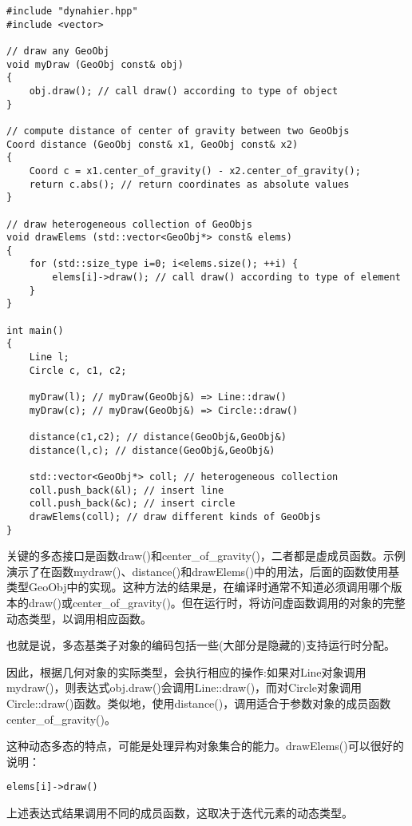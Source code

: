 \begin{lstlisting}[style=styleCXX]
#include "dynahier.hpp"
#include <vector>

// draw any GeoObj
void myDraw (GeoObj const& obj)
{
	obj.draw(); // call draw() according to type of object
}

// compute distance of center of gravity between two GeoObjs
Coord distance (GeoObj const& x1, GeoObj const& x2)
{
	Coord c = x1.center_of_gravity() - x2.center_of_gravity();
	return c.abs(); // return coordinates as absolute values
}

// draw heterogeneous collection of GeoObjs
void drawElems (std::vector<GeoObj*> const& elems)
{
	for (std::size_type i=0; i<elems.size(); ++i) {
		elems[i]->draw(); // call draw() according to type of element
	}
}

int main()
{
	Line l;
	Circle c, c1, c2;
	
	myDraw(l); // myDraw(GeoObj&) => Line::draw()
	myDraw(c); // myDraw(GeoObj&) => Circle::draw()
	
	distance(c1,c2); // distance(GeoObj&,GeoObj&)
	distance(l,c); // distance(GeoObj&,GeoObj&)
	
	std::vector<GeoObj*> coll; // heterogeneous collection
	coll.push_back(&l); // insert line
	coll.push_back(&c); // insert circle
	drawElems(coll); // draw different kinds of GeoObjs
}
\end{lstlisting}

关键的多态接口是函数draw()和center\_of\_gravity()，二者都是虚成员函数。示例演示了在函数mydraw()、distance()和drawElems()中的用法，后面的函数使用基类型GeoObj中的实现。这种方法的结果是，在编译时通常不知道必须调用哪个版本的draw()或center\_of\_gravity()。但在运行时，将访问虚函数调用的对象的完整动态类型，以调用相应函数。

\begin{tcolorbox}[colback=webgreen!5!white,colframe=webgreen!75!black]
\hspace*{0.75cm}也就是说，多态基类子对象的编码包括一些(大部分是隐藏的)支持运行时分配。
\end{tcolorbox}

因此，根据几何对象的实际类型，会执行相应的操作:如果对Line对象调用mydraw()，则表达式obj.draw()会调用Line::draw()，而对Circle对象调用Circle::draw()函数。类似地，使用distance()，调用适合于参数对象的成员函数center\_of\_gravity()。

这种动态多态的特点，可能是处理异构对象集合的能力。drawElems()可以很好的说明：

\begin{lstlisting}[style=styleCXX]
elems[i]->draw()
\end{lstlisting}

上述表达式结果调用不同的成员函数，这取决于迭代元素的动态类型。


























